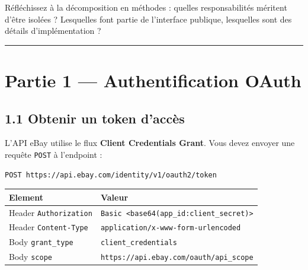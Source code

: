 \documentclass[
  french,
  letterpaper,
  DIV=11,
  numbers=noendperiod]{scrartcl}
\begin{document}
Réfléchissez à la décomposition en méthodes : quelles responsabilités
méritent d'être isolées ? Lesquelles font partie de l'interface
publique, lesquelles sont des détails d'implémentation ?

\begin{center}\rule{0.5\linewidth}{0.5pt}\end{center}

\section{Partie 1 --- Authentification
OAuth}\label{partie-1-authentification-oauth}

\subsection{1.1 Obtenir un token
d'accès}\label{obtenir-un-token-daccuxe8s}

L'API eBay utilise le flux \textbf{Client Credentials Grant}. Vous devez
envoyer une requête \texttt{POST} à l'endpoint :

\begin{verbatim}
POST https://api.ebay.com/identity/v1/oauth2/token
\end{verbatim}

\begin{longtable}[]{@{}ll@{}}
\toprule\noalign{}
Element & Valeur \\
\midrule\noalign{}
\endhead
\bottomrule\noalign{}
\endlastfoot
Header \texttt{Authorization} &
\texttt{Basic\ \textless{}base64(app\_id:client\_secret)\textgreater{}} \\
Header \texttt{Content-Type} &
\texttt{application/x-www-form-urlencoded} \\
Body \texttt{grant\_type} & \texttt{client\_credentials} \\
Body \texttt{scope} & \texttt{https://api.ebay.com/oauth/api\_scope} \\
\end{longtable}
\end{document}
